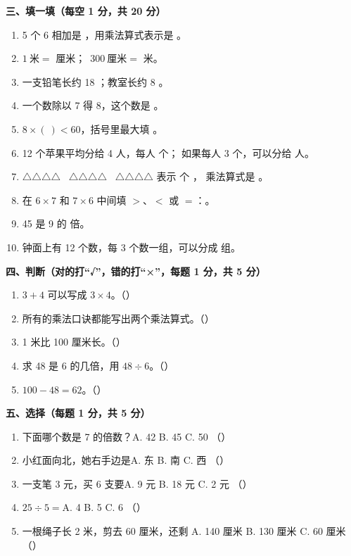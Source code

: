 \noindent\textbf{三、填一填（每空 1 分，共 20 分）}
\begin{enumerate}[label=\arabic*.,itemsep=3pt]
  \item 5 个 6 相加是 \blank[1.4cm]，用乘法算式表示是 \blank[3cm]。
  \item $1\ \text{米}=$ \blank[1.2cm] 厘米；\ $300\ \text{厘米}=$ \blank[1.2cm] 米。
  \item 一支铅笔长约 18 \blank[1.4cm]；教室长约 8 \blank[1.4cm]。
  \item 一个数除以 7 得 8，这个数是 \blank[1.4cm]。
  \item $8\times(\ )<60$，括号里最大填 \blank[1.4cm]。
  \item 12 个苹果平均分给 4 人，每人 \blank[1.2cm] 个；
        如果每人 3 个，可以分给 \blank[1.2cm] 人。
  \item $\triangle\triangle\triangle\triangle$ \ $\triangle\triangle\triangle\triangle$ \
        $\triangle\triangle\triangle\triangle$ 表示 \blank[1cm] 个 \blank[1cm]，
        乘法算式是 \blank[2.6cm]。
  \item 在 $6\times7$ 和 $7\times6$ 中间填 $>$、$<$ 或 $=$：\blank[1.4cm]。
  \item 45 是 9 的 \blank[1.2cm] 倍。
  \item 钟面上有 12 个数，每 3 个数一组，可以分成 \blank[1.2cm] 组。
\end{enumerate}

\noindent\textbf{四、判断（对的打“√”，错的打“×”，每题 1 分，共 5 分）}
\begin{enumerate}[label=\arabic*.,itemsep=2pt]
  \item $3+4$ 可以写成 $3\times4$。\hfill（\quad）
  \item 所有的乘法口诀都能写出两个乘法算式。\hfill（\quad）
  \item 1 米比 100 厘米长。\hfill（\quad）
  \item 求 48 是 6 的几倍，用 $48\div6$。\hfill（\quad）
  \item $100-48=62$。\hfill（\quad）
\end{enumerate}

\noindent\textbf{五、选择（每题 1 分，共 5 分）}
\begin{enumerate}[label=\arabic*.,itemsep=2pt]
  \item 下面哪个数是 7 的倍数？\quad A. 42 \quad B. 45 \quad C. 50 \hfill（\quad）
  \item 小红面向北，她右手边是\quad A. 东 \quad B. 南 \quad C. 西 \hfill（\quad）
  \item 一支笔 3 元，买 6 支要\quad A. 9 元 \quad B. 18 元 \quad C. 2 元 \hfill（\quad）
  \item $25\div5=$\quad A. 4 \quad B. 5 \quad C. 6 \hfill（\quad）
  \item 一根绳子长 2 米，剪去 60 厘米，还剩\quad
        A. 140 厘米 \quad B. 130 厘米 \quad C. 60 厘米 \hfill（\quad）
\end{enumerate}

